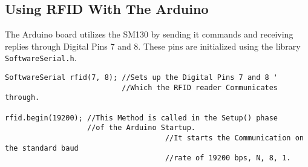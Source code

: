 \subsection{Using RFID With The Arduino}
The Arduino board utilizes the SM130 by sending it commands and receiving replies through Digital Pins 7 and 8.
These pins are initialized using the library \verb|SoftwareSerial.h|.\\
\begin{lstlisting}
SoftwareSerial rfid(7, 8); //Sets up the Digital Pins 7 and 8 '
                           //Which the RFID reader Communicates through.
													
rfid.begin(19200); //This Method is called in the Setup() phase 
                   //of the Arduino Startup.
									 //It starts the Communication on the standard baud
									 //rate of 19200 bps, N, 8, 1.
											
\end{lstlisting}

